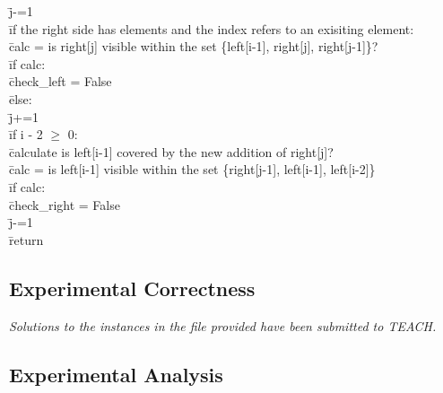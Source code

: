 \documentclass{article}
\begin{document}
\begin{tabbing}
              \> \qquad \qquad \qquad \= j-=1\\
      \> \qquad \qquad \= if the right side has elements and the index refers to an exisiting element:\\
        \> \qquad \qquad \qquad \= calc = is right[j] visible within the set \{left[i-1], right[j], right[j-1]\}?\\
        \> \qquad \qquad \= if calc:\\
          \> \qquad \qquad \qquad \= check\_left = False\\
        \> \qquad \qquad \= else:\\
          \> \qquad \qquad \qquad \= j+=1\\
          \> \qquad \qquad \= if i - 2 $\geq$ 0:\\
            \> \qquad \qquad \qquad \= calculate is left[i-1] covered by the new addition of right[j]?\\
            \> \qquad \qquad \qquad \= calc = is left[i-1] visible within the set \{right[j-1], left[i-1], left[i-2]\}\\
            \> \qquad \qquad \= if calc:\\
              \> \qquad \qquad \qquad \= check\_right = False\\
              \> \qquad \qquad \qquad \= j-=1\\
  \> \qquad \= return
\end{tabbing}

\pagebreak 

\subsection*{Experimental Correctness}

\emph{Solutions to the instances in the file provided have been submitted to TEACH.}

\subsection*{Experimental Analysis}
\end{document}
